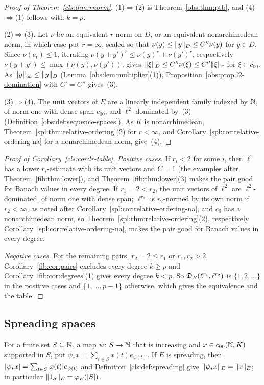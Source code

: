 \begin{proof}[Proof of Theorem~\ref{cls:thm:rnorm}]
(1)$\Rightarrow$(2) is Theorem~\ref{obs:thm:ptb}, and (4)$\Rightarrow$(1) follows with $k=p$.

(2)$\Rightarrow$(3). Let $\nu$ be an equivalent $r$\nobreakdash-norm on $D$, or an equivalent nonarchimedean norm, in
which case put $r=\infty$, scaled so that $\nu(y)\le\lVert y\rVert_D\le C''\nu(y)$ for $y\in D$. Since $\nu(e_t)\le1$, iterating
$\nu(y+y')^r\le\nu(y)^r+\nu(y')^r$, respectively $\nu(y+y')\le\max(\nu(y),\nu(y'))$, gives
$\lVert \xi\rVert_D\le C''\nu(\xi)\le C''\lVert \xi\rVert_r$ for $\xi\in c_{00}$. As $\lVert y\rVert_\infty\le\lVert y\rVert_D$
(Lemma~\ref{obs:lem:multiplier}(1)), Proposition~\ref{obs:prop:l2-domination} with $C'=C''$ gives~(3).

(3)$\Rightarrow$(4). The unit vectors of $E$ are a linearly independent family indexed by $\mathbb N$, of norm one with dense
span $c_{00}$, and $\ell^2$\nobreakdash-dominated by~(3) (Definition~\ref{obs:def:sequence-spaces}). As $K$ is
nonarchimedean, Theorem~\ref{spl:thm:relative-ordering}(2) for $r<\infty$, and
Corollary~\ref{spl:cor:relative-ordering-na} for a nonarchimedean norm, give~(4).
\end{proof}

\begin{proof}[Proof of Corollary~\ref{cls:cor:lr-table}]
\emph{Positive cases.} If $r_i<2$ for some $i$, then $\ell^{r_i}$ has a lower $r_i$\nobreakdash-estimate with its unit
vectors and $C=1$ (the examples after Theorem~\ref{fib:thm:lower}), and Theorem~\ref{fib:thm:lower}(3) makes the pair good
for Banach values in every degree. If $r_1=2<r_2$, the unit vectors of $\ell^2$ are $\ell^2$\nobreakdash-dominated, of norm one
with dense span; $\ell^{r_2}$ is $r_2$\nobreakdash-normed by its own norm if $r_2<\infty$, as noted
after Corollary~\ref{spl:cor:relative-ordering-na}, and $c_0$ has a nonarchimedean norm, so
Theorem~\ref{spl:thm:relative-ordering}(2), respectively Corollary~\ref{spl:cor:relative-ordering-na}, makes the pair good
for Banach values in every degree.

\emph{Negative cases.} For the remaining pairs, $r_2=2\le r_1$ or $r_1,r_2>2$, Corollary~\ref{fib:cor:pairs}
excludes every degree $k\ge p$ and Corollary~\ref{fib:cor:degrees}(1) gives every degree $k<p$. So
$\mathfrak D_B(\ell^{r_1},\ell^{r_2})$ is $\{1,2,\dots\}$ in the positive cases and $\{1,\dots,p-1\}$ otherwise, which gives the
equivalence and the table.
\end{proof}

\subsection{Spreading spaces}\label{frc:ssec:spreading}
For a finite set $S\subseteq\mathbb N$, a map $\psi\colon S\to\mathbb N$ that is increasing and $x\in c_{00}(\mathbb N,K)$ supported in $S$,
put $\psi_*x=\sum_{t\in S}x(t)e_{\psi(t)}$. If $E$ is spreading, then $\lvert \psi_*x\rvert=\sum_{t\in S}\lvert x(t)\rvert e_{\psi(t)}$
and Definition~\ref{cls:def:spreading} give $\lVert \psi_*x\rVert_E=\lVert x\rVert_E$; in particular $\lVert 1_S\rVert_E=\varphi_E(\lvert S\rvert)$.

